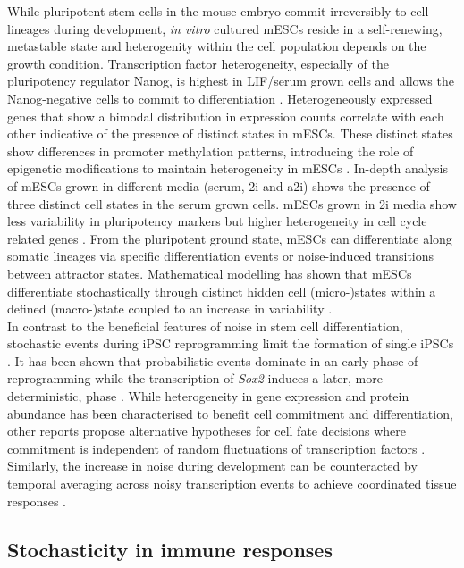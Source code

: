 While pluripotent stem cells in the mouse embryo commit irreversibly to cell lineages during development, \emph{in vitro} cultured \glspl{mESC} reside in a self-renewing, metastable state \citep{Hayashi2008} and heterogenity within the cell population depends on the growth condition. 
Transcription factor heterogeneity, especially of the pluripotency regulator Nanog, is highest in \gls{LIF}/serum grown cells and allows the Nanog-negative cells to commit to differentiation \citep{Chickarmane2012, Torres-Padilla2014}. 
Heterogeneously expressed genes that show a bimodal distribution in expression counts correlate with each other indicative of the presence of distinct states in mESCs. 
These distinct states show differences in promoter methylation patterns, introducing the role of epigenetic modifications to maintain heterogeneity in mESCs \citep{Singer2014}. 
In-depth analysis of mESCs grown in different media (serum, \gls{2i} and \gls{a2i}) shows the presence of three distinct cell states in the serum grown cells. 
mESCs grown in 2i media show less variability in pluripotency markers but higher heterogeneity in cell cycle related genes \citep{Kolodziejczyk2015cell}. 
From the pluripotent ground state, mESCs can differentiate along somatic lineages via specific differentiation events or noise-induced transitions between attractor states. 
Mathematical modelling has shown that mESCs differentiate stochastically through distinct hidden cell (micro-)states within a defined (macro-)state coupled to an increase in variability \cite{Stumpf2017}.\\

In contrast to the beneficial features of noise in stem cell differentiation, stochastic events during \gls{iPSC} reprogramming limit the formation of single iPSCs \citep{Hanna2009, Yamanaka2009}. 
It has been shown that probabilistic events dominate in an early phase of reprogramming while the transcription of \textit{Sox2} induces a later, more deterministic, phase \cite{Buganim2012}. 
While heterogeneity in gene expression and protein abundance has been characterised to benefit cell commitment and differentiation, other reports propose alternative hypotheses for cell fate decisions where commitment is independent of random fluctuations of transcription factors \cite{Hoppe2016}. 
Similarly, the increase in noise during development can be counteracted by temporal averaging across noisy transcription events to achieve coordinated tissue responses \citep{Stapel2017}. 

\subsection{Stochasticity in immune responses}


